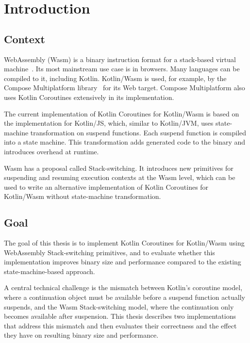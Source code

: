 \chapter{Introduction}
\label{ch:introduction}

\section{Context}

WebAssembly (Wasm) is a binary instruction format for a stack-based virtual machine~\cite{wasm-spec}. Its most mainstream use case is in
browsers. Many languages can be compiled to it, including Kotlin. Kotlin/Wasm is used, for example, by the Compose
Multiplatform library~\cite{compose-multiplatform} for its Web target. Compose Multiplatform also uses Kotlin Coroutines extensively in its
implementation.

The current implementation of Kotlin Coroutines for Kotlin/Wasm is based on the implementation for Kotlin/JS, which,
similar to Kotlin/JVM, uses state-machine transformation on suspend functions. Each suspend function is compiled into
a state machine. This transformation adds generated code to the binary and introduces overhead at runtime.

Wasm has a proposal called Stack-switching. It introduces new primitives for suspending and resuming execution
contexts at the Wasm level, which can be used to write an alternative implementation of Kotlin Coroutines for
Kotlin/Wasm without state-machine transformation.

\section{Goal}
\label{sec:motivation}

The goal of this thesis is to implement Kotlin Coroutines for Kotlin/Wasm using WebAssembly Stack-switching
primitives, and to evaluate whether this implementation improves binary size and performance compared to the
existing state-machine-based approach.

A central technical challenge is the mismatch between Kotlin's coroutine model, where a continuation object must be
available before a suspend function actually suspends, and the Wasm Stack-switching model, where the continuation
only becomes available after suspension. This thesis describes two implementations that address this mismatch and then
evaluates their correctness and the effect they have on resulting binary size and performance.

